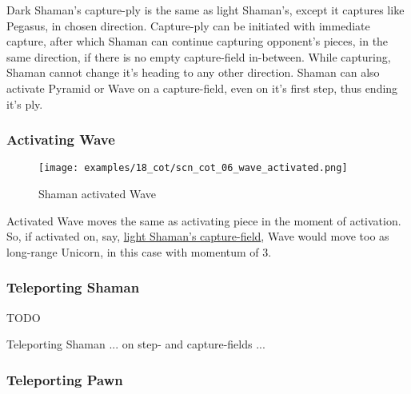 Dark Shaman's capture-ply is the same as light Shaman's, except it captures like
Pegasus, in chosen direction. Capture-ply can be initiated with immediate capture,
after which Shaman can continue capturing opponent's pieces, in the same direction,
if there is no empty capture-field in-between. While capturing, Shaman cannot change
it's heading to any other direction. Shaman can also activate Pyramid or Wave on a
capture-field, even on it's first step, thus ending it's ply.

\clearpage %

\subsubsection*{Activating Wave}

\noindent
\begin{figure}[!h]
\texttt{[image: examples/18\_cot/scn\_cot\_06\_wave\_activated.png]}
\caption{Shaman activated Wave}
\label{fig:scn_cot_06_wave_activated}
\end{figure}

Activated Wave moves the same as activating piece in the moment of activation.
So, if activated on, say,
\hyperref[fig:scn_cot_03_light_shaman_capture_ply]{light Shaman's capture-field},
Wave would move too as long-range Unicorn, in this case with momentum of 3.

\clearpage %

\subsubsection*{Teleporting Shaman}

\huge{TODO}
\normalsize{}

Teleporting Shaman ... on step- and capture-fields ...

\clearpage %

\subsubsection*{Teleporting Pawn}

